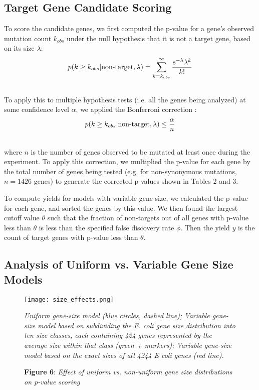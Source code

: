 \documentclass[letterpaper,10pt,english]{howto}
\begin{document}
\subsection{Target Gene Candidate Scoring}

To score the candidate genes, we first computed the p-value for
a gene's observed mutation count $k_{obs}$
under the null hypothesis that it is not a target gene,
based on its size $\lambda$:
\begin{gather}
\begin{split}p(k\ge k_{obs}|\text{non-target}, \lambda)
= \sum_{k=k_{obs}}^\infty{\frac{e^{-\lambda}\lambda^k}{k!}}\end{split}\notag\\\begin{split}\end{split}\notag
\end{gather}
To apply this to multiple hypothesis tests (i.e. all the genes
being analyzed) at some confidence level $\alpha$,
we applied the Bonferroni correction \cite{Bonferroni36} :
\begin{gather}
\begin{split}p(k\ge k_{obs}|\text{non-target}, \lambda) \le \frac{\alpha}{n}\end{split}\notag\\\begin{split}\end{split}\notag
\end{gather}
where $n$ is the number of genes observed to be mutated at least
once during the experiment.  To apply this correction, we multiplied
the p-value for each gene by the total number of genes being tested
(e.g. for non-synonymous mutations, $n=1426$ genes)
to generate the corrected p-values shown in Tables 2 and 3.

To compute yields for models with variable gene size, we calculated
the p-value for each gene, and sorted the genes by this value.  We then
found the largest cutoff value $\theta$ such that the fraction
of non-targets out of all genes with p-value less than $\theta$ is
less than the specified false discovery rate $\phi$.  Then
the yield $y$ is the count of target genes with p-value
less than $\theta$.


\subsection{Analysis of Uniform vs. Variable Gene Size Models}
\begin{figure}[htbp]
\centering

\texttt{[image: size\_effects.png]}
\caption{\textbf{Figure 6}: \emph{Effect of uniform vs. non-uniform gene size distributions on p-value scoring}}{\small 
\emph{Uniform gene-size model (blue circles, dashed line);
Variable gene-size model
based on subdividing the E. coli gene size distribution into
ten size classes, each containing 424 genes represented by the
average size within that class (green + markers);
Variable gene-size model based on the exact sizes of all 4244
E coli genes (red line).}
}\end{figure}
\end{document}
